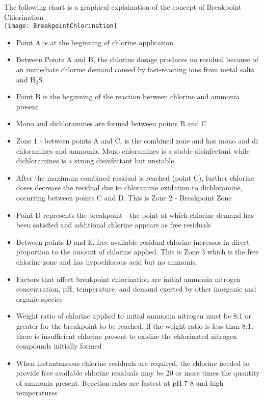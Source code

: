The following chart is a graphical explaination of the concept of Breakpoint Chlorination\\
			\texttt{[image: BreakpointChlorination]}
			\begin{itemize}
				\item Point A is at the beginning of chlorine application
				\item Between Points A and B, the chlorine dosage produces no residual because of an immediate chlorine demand caused by fast-reacting ions from metal salts and H$_2$S.
				\item Point B is the beginning of the reaction between chlorine and ammonia present
				\item Mono and dichloramines are formed between points B and C
				\item Zone 1 - between points A and C, is the combined zone and has mono and di  chloramines and ammonia.  Mono chloramines is a stable disinfectant while dichloramines is a strong disinfectant but unstable.
				\item After the maximum combined residual is reached (point C), further chlorine doses decrease the residual due to chloramine oxidation to dichloramine, occurring between points C and D.  This is Zone 2 - Breakpoint Zone
				\item Point D represents the breakpoint - the point at which chlorine demand has been satisfied and additional chlorine appears as free residuals
				\item Between points D and E, free available residual chlorine increases in direct proportion to the amount of chlorine applied.  This is Zone 3 which is the free chlorine zone and has hypochlorous acid but no ammonia. \\
			\end{itemize}
			\begin{itemize}
				\item Factors that affect breakpoint chlorination are initial ammonia nitrogen concentration, pH, temperature, and demand exerted by other inorganic and organic species
				\item Weight ratio of chlorine applied to initial ammonia nitrogen must be 8:1 or greater for the breakpoint to be reached. If the weight ratio is less than 8:1, there is insufficient chlorine present to oxidize the chlorinated nitrogen compounds initially formed
				\item When instantaneous chlorine residuals are required, the chlorine needed to provide free available chlorine residuals may be 20 or more times the quantity of ammonia present. Reaction rates are fastest at pH 7-8 and high temperatures
			\end{itemize}


